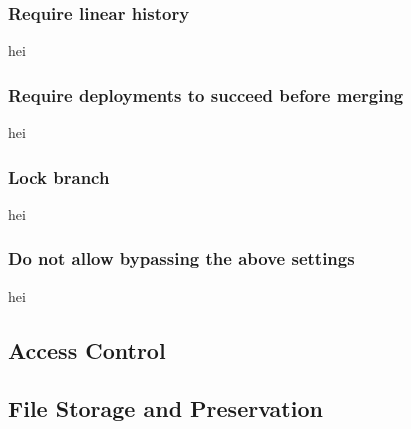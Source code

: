 \subsubsection{Require linear history}
hei
\subsubsection{Require deployments to succeed before merging}
hei
\subsubsection{Lock branch}
hei
\subsubsection{Do not allow bypassing the above settings}
hei

\newpage



\subsection{Access Control}
\subsection{File Storage and Preservation}